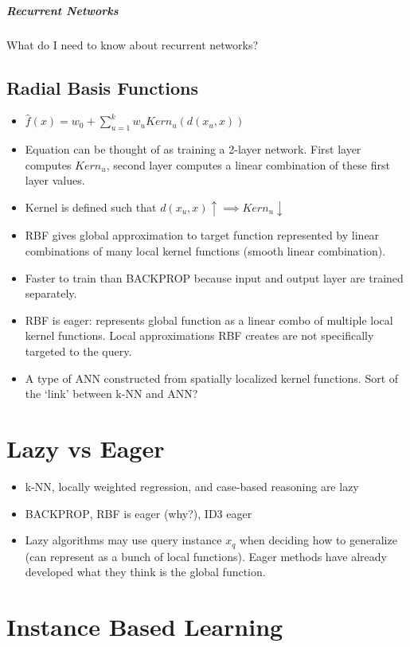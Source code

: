 \documentclass[11pt]{article}
\begin{document}
\subparagraph{Recurrent Networks}
What do I need to know about recurrent networks?

\subsection{Radial Basis Functions}
\begin{itemize}
\item $\hat{f}(x) = w_0+ \sum_{u=1}^k{w_uKern_u(d(x_u, x))}$
\item Equation can be thought of as training a 2-layer network. First layer computes $Kern_u$, second layer computes a linear combination of these first layer values.
\item Kernel is defined such that $d(x_u, x) \uparrow \implies Kern_u \downarrow$
\item RBF gives global approximation to target function represented by linear combinations of many local kernel functions (smooth linear combination).
\item Faster to train than \textsc{BACKPROP} because input and output layer are trained separately.
\item RBF is eager: represents global function as a linear combo of multiple local kernel functions. Local approximations RBF creates are not specifically targeted to the query.
\item A type of ANN constructed from spatially localized kernel functions. Sort of the `link' between k-NN and ANN?
\end{itemize}


\section{Lazy vs Eager}
\begin{itemize}
\item k-NN, locally weighted regression, and case-based reasoning are lazy
\item \textsc{BACKPROP}, RBF is eager (why?), ID3 eager
\item Lazy algorithms may use query instance $x_q$ when deciding how to generalize (can represent as a bunch of local functions). Eager methods have already developed what they think is the global function.
\end{itemize}
\section{Instance Based Learning}
\end{document}
